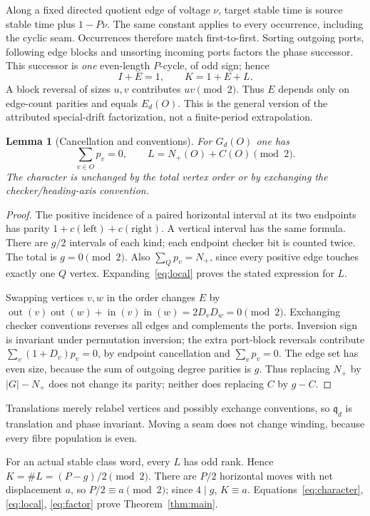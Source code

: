 \documentclass[11pt]{article}
\newtheorem{lemma}[theorem]{Lemma}
\newcommand{\qd}{\mathfrak q_d}
\begin{document}
Along a fixed directed quotient edge of voltage $\nu$, target stable time is
source stable time plus $1-P\nu$. The same constant applies to every occurrence,
including the cyclic seam. Occurrences therefore match first-to-first.
Sorting outgoing ports, following edge blocks and unsorting incoming ports
factors the phase successor. This successor is \emph{one} even-length $P$-cycle,
of odd sign; hence
\begin{equation}
 I+E=1,\qquad K=1+E+L.\label{eq:factor}
\end{equation}
A block reversal of sizes $u,v$ contributes $uv\pmod2$. Thus $E$ depends only
on edge-count parities and equals $E_d(O)$. This is the general version of the
attributed special-drift factorization, not a finite-period extrapolation.

\begin{lemma}[Cancellation and conventions]\label{lem:cancel}
For $G_d(O)$ one has
\[
 \sum_{v\in O}p_v=0,\qquad L=N_+(O)+C(O)\pmod2.
\]
The character is unchanged by the total vertex order or by exchanging the
checker/heading-axis convention.
\end{lemma}
\begin{proof}
The positive incidence of a paired horizontal interval at its two endpoints
has parity $1+c(\text{left})+c(\text{right})$. A vertical interval has the same
formula. There are $g/2$ intervals of each kind; each endpoint checker bit is
counted twice. The total is $g=0\pmod2$.
Also $\sum_Qp_v=N_+$, since every positive edge touches exactly one $Q$ vertex.
Expanding~\eqref{eq:local} proves the stated expression for $L$.

Swapping vertices $v,w$ in the order changes $E$ by
$\operatorname{out}(v)\operatorname{out}(w)+
\operatorname{in}(v)\operatorname{in}(w)=2D_vD_w=0\pmod2$.
Exchanging checker conventions reverses all edges and complements the ports.
Inversion sign is invariant under permutation inversion; the extra port-block
reversals contribute $\sum_v(1+D_v)p_v=0$, by endpoint cancellation and
$\sum_vp_v=0$. The edge set has even size, because the sum of outgoing degree
parities is $g$. Thus replacing $N_+$ by $|G|-N_+$ does not change its parity;
neither does replacing $C$ by $g-C$.
\end{proof}
Translations merely relabel vertices and possibly exchange conventions, so
$\qd$ is translation and phase invariant. Moving a seam does not change winding,
because every fibre population is even.

For an actual stable class word, every $L$ has odd rank. Hence
$K=\#L=(P-g)/2\pmod2$. There are $P/2$ horizontal moves with net displacement
$a$, so $P/2\equiv a\pmod2$; since $4\mid g$, $K\equiv a$.
Equations~\eqref{eq:character}, \eqref{eq:local}, \eqref{eq:factor} prove
Theorem~\ref{thm:main}.
\end{document}
